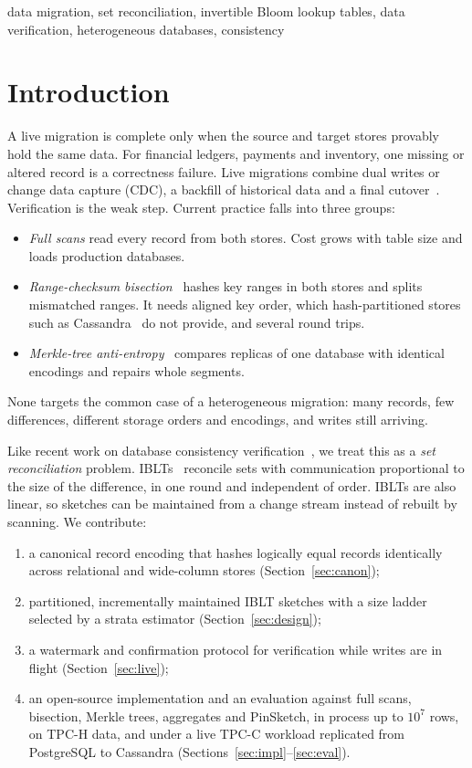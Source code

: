 \documentclass[conference]{IEEEtran}
\begin{document}
\begin{IEEEkeywords}
data migration, set reconciliation, invertible Bloom lookup tables, data verification, heterogeneous databases, consistency
\end{IEEEkeywords}

\section{Introduction}
A live migration is complete only when the source and target stores provably hold the same data. For financial ledgers, payments and inventory, one missing or altered record is a correctness failure. Live migrations combine dual writes or change data capture (CDC), a backfill of historical data and a final cutover~\cite{xu2017,rae2013}. Verification is the weak step. Current practice falls into three groups:
\begin{itemize}
\item \emph{Full scans} read every record from both stores. Cost grows with table size and loads production databases.
\item \emph{Range-checksum bisection}~\cite{datadiff} hashes key ranges in both stores and splits mismatched ranges. It needs aligned key order, which hash-partitioned stores such as Cassandra~\cite{lakshman2010} do not provide, and several round trips.
\item \emph{Merkle-tree anti-entropy}~\cite{lakshman2010,merkle1987} compares replicas of one database with identical encodings and repairs whole segments.
\end{itemize}
None targets the common case of a heterogeneous migration: many records, few differences, different storage orders and encodings, and writes still arriving.

Like recent work on database consistency verification~\cite{wu2026}, we treat this as a \emph{set reconciliation} problem. IBLTs~\cite{goodrich2011,eppstein2011} reconcile sets with communication proportional to the size of the difference, in one round and independent of order. IBLTs are also linear, so sketches can be maintained from a change stream instead of rebuilt by scanning. We contribute:
\begin{enumerate}
\item a canonical record encoding that hashes logically equal records identically across relational and wide-column stores (Section~\ref{sec:canon});
\item partitioned, incrementally maintained IBLT sketches with a size ladder selected by a strata estimator (Section~\ref{sec:design});
\item a watermark and confirmation protocol for verification while writes are in flight (Section~\ref{sec:live});
\item an open-source implementation and an evaluation against full scans, bisection, Merkle trees, aggregates and PinSketch, in process up to $10^7$ rows, on TPC-H data, and under a live TPC-C workload replicated from PostgreSQL to Cassandra (Sections~\ref{sec:impl}--\ref{sec:eval}).
\end{enumerate}
\end{document}
